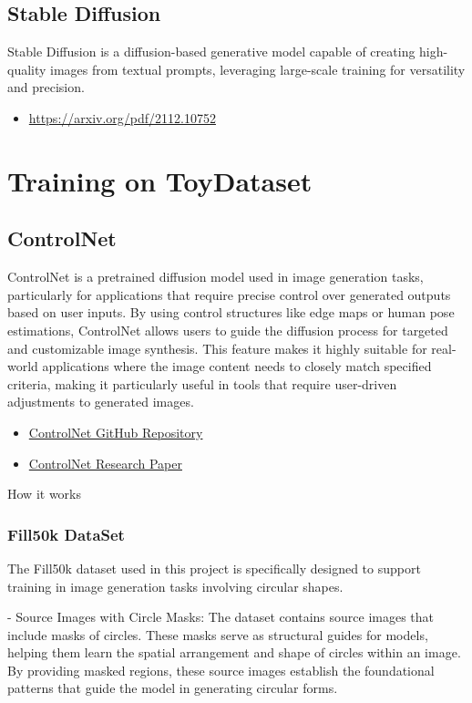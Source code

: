 \documentclass[12pt,a4paper]{report}
\begin{document}
\section*{Stable Diffusion}
Stable Diffusion is a diffusion-based generative model capable of creating high-quality images from textual prompts, leveraging large-scale training for versatility and precision.
\begin{itemize}
    \item \href{https://arxiv.org/pdf/2112.10752}{https://arxiv.org/pdf/2112.10752}
\end{itemize}



\chapter*{Training on ToyDataset}

\section*{ControlNet}
ControlNet is a pretrained diffusion model used in image generation tasks, particularly for applications that require precise control over generated outputs based on user inputs. By using control structures like edge maps or human pose estimations, ControlNet allows users to guide the diffusion process for targeted and customizable image synthesis. This feature makes it highly suitable for real-world applications where the image content needs to closely match specified criteria, making it particularly useful in tools that require user-driven adjustments to generated images.
\begin{itemize}
    \item \href{https://github.com/lllyasviel/ControlNet}{ControlNet GitHub Repository}
    \item \href{https://arxiv.org/pdf/2302.05543}{ControlNet Research Paper}
\end{itemize}

How it works

    

\subsection*{Fill50k DataSet}

The Fill50k dataset used in this project is specifically designed to support training in image generation tasks involving circular shapes.

- Source Images with Circle Masks: The dataset contains source images that include masks of circles. These masks serve as structural guides for models, helping them learn the spatial arrangement and shape of circles within an image. By providing masked regions, these source images establish the foundational patterns that guide the model in generating circular forms.
\end{document}
